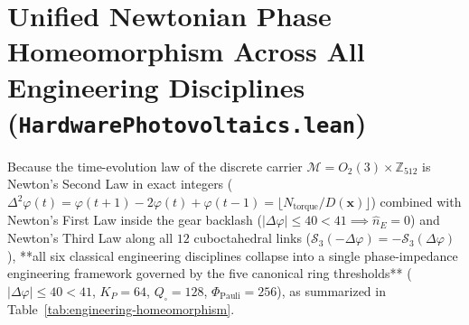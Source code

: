 \documentclass[11pt,a4paper]{article}
\theoremstyle{definition}
\theoremstyle{remark}
\begin{document}
\section{Unified Newtonian Phase Homeomorphism Across All Engineering Disciplines (\texttt{HardwarePhotovoltaics.lean})}
\label{sec:unified-engineering-homeomorphism}

Because the time-evolution law of the discrete carrier $\mathcal{M} = O_2(3)\times\mathbb{Z}_{512}$ is Newton's Second Law in exact integers ($\Delta^2\varphi(t) = \varphi(t+1)-2\varphi(t)+\varphi(t-1) = \lfloor N_{\mathrm{torque}}/D(\mathbf{x})\rfloor$) combined with Newton's First Law inside the gear backlash ($|\Delta\varphi|\le 40 < 41 \implies \hat{n}_E = 0$) and Newton's Third Law along all $12$ cuboctahedral links ($\mathcal{S}_3(-\Delta\varphi) = -\mathcal{S}_3(\Delta\varphi)$), **all six classical engineering disciplines collapse into a single phase-impedance engineering framework governed by the five canonical ring thresholds** ($|\Delta\varphi|\le 40 < 41$, $K_P = 64$, $Q_\square = 128$, $\Phi_{\mathrm{Pauli}} = 256$), as summarized in Table~\ref{tab:engineering-homeomorphism}.
\end{document}
